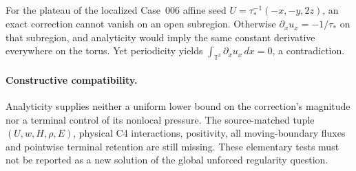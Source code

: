 For the plateau of the localized Case~006 affine seed $U=\tau_*^{-1}(-x,-y,2z)$, an exact correction cannot vanish on an open subregion. Otherwise $\partial_xu_x=-1/\tau_*$ on that subregion, and analyticity would imply the same constant derivative everywhere on the torus. Yet periodicity yields $\int_{\mathbb T^3}\partial_xu_x\,dx=0$, a contradiction.

\paragraph{Constructive compatibility.}
Analyticity supplies neither a uniform lower bound on the correction's magnitude nor a terminal control of its nonlocal pressure. The source-matched tuple $(U,w,H,\rho,E)$, physical C4 interactions, positivity, all moving-boundary fluxes and pointwise terminal retention are still missing. These elementary tests must not be reported as a new solution of the global unforced regularity question.
